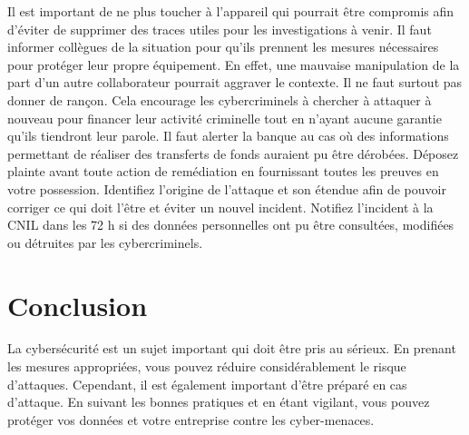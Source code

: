 \documentclass[a4paper,11pt]{article}
\begin{document}
Il est important de ne plus toucher à l’appareil qui pourrait être compromis afin d’éviter de supprimer des traces utiles pour les investigations à venir. 
Il faut informer collègues de la situation pour qu’ils prennent les mesures nécessaires pour protéger leur propre équipement. En effet, une mauvaise manipulation de la part d’un autre collaborateur pourrait aggraver le contexte.
Il ne faut surtout pas donner de rançon. Cela encourage les cybercriminels à chercher à attaquer à nouveau pour financer leur activité criminelle tout en n’ayant aucune garantie qu’ils tiendront leur parole.
Il faut alerter la banque au cas où des informations permettant de réaliser des transferts de fonds auraient pu être dérobées.
Déposez plainte avant toute action de remédiation en fournissant toutes les preuves en votre possession.
Identifiez l’origine de l’attaque et son étendue afin de pouvoir corriger ce qui doit l’être et éviter un nouvel incident.
Notifiez l’incident à la CNIL dans les 72 h si des données personnelles ont pu être consultées, modifiées ou détruites par les cybercriminels.

\section{Conclusion}

La cybersécurité est un sujet important qui doit être pris au sérieux. En prenant les mesures appropriées, vous pouvez réduire considérablement le risque d’attaques. Cependant, il est également important d’être préparé en cas d’attaque. En suivant les bonnes pratiques et en étant vigilant, vous pouvez protéger vos données et votre entreprise contre les cyber-menaces.




\end{document}
